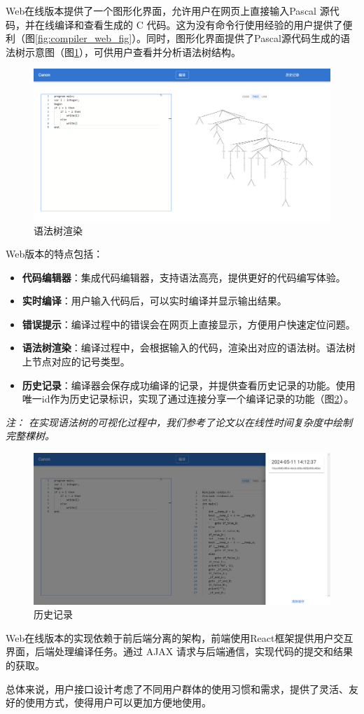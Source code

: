 \documentclass[../main.tex]{subfiles}
\begin{document}
Web在线版本提供了一个图形化界面，允许用户在网页上直接输入Pascal 源代码，并在线编译和查看生成的 C 代码。这为没有命令行使用经验的用户提供了便利（图\ref{fig:compiler_web_fig}）。同时，图形化界面提供了Pascal源代码生成的语法树示意图（图\ref{fig:compiler_web_fig_tree}），可供用户查看并分析语法树结构。

\begin{figure}[h]
    \centering
    \includegraphics[width=0.9\linewidth]{assets/编译器Web在线版本_语法树.png}
    \caption{语法树渲染}
    \label{fig:compiler_web_fig_tree}
\end{figure}

Web版本的特点包括：

\begin{itemize}
    \item \textbf{代码编辑器}：集成代码编辑器，支持语法高亮，提供更好的代码编写体验。
    \item \textbf{实时编译}：用户输入代码后，可以实时编译并显示输出结果。
    \item \textbf{错误提示}：编译过程中的错误会在网页上直接显示，方便用户快速定位问题。
    \item \textbf{语法树渲染}：编译过程中，会根据输入的代码，渲染出对应的语法树。语法树上节点对应的记号类型。
    \item \textbf{历史记录}：编译器会保存成功编译的记录，并提供查看历史记录的功能。使用唯一id作为历史记录标识，实现了通过连接分享一个编译记录的功能（图\ref{fig:compiler_web_fig_history}）。
\end{itemize}

\textit{注： 在实现语法树的可视化过程中，我们参考了论文\cite{goos_improving_2002}以在线性时间复杂度中绘制完整棵树。}

\begin{figure}[h]
    \centering
    \includegraphics[width=0.9\linewidth]{assets/编译器Web在线版本_历史记录.png}
    \caption{历史记录}
    \label{fig:compiler_web_fig_history}
\end{figure}

Web在线版本的实现依赖于前后端分离的架构，前端使用React框架提供用户交互界面，后端处理编译任务。通过 AJAX 请求与后端通信，实现代码的提交和结果的获取。

总体来说，用户接口设计考虑了不同用户群体的使用习惯和需求，提供了灵活、友好的使用方式，使得用户可以更加方便地使用。
\end{document}

